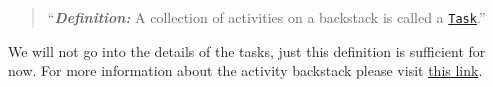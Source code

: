 \begin{quote}
	``\textit{\textbf{Definition:}} A collection of activities on a backstack is called a \href{https://developer.android.com/guide/components/tasks-and-back-stack.html#ManagingTasks}{\texttt{Task}}.''
\end{quote}

We will not go into the details of the tasks, just this definition is sufficient for now. For more information about the activity backstack please visit \href{https://developer.android.com/guide/components/tasks-and-back-stack.html}{this link}.
